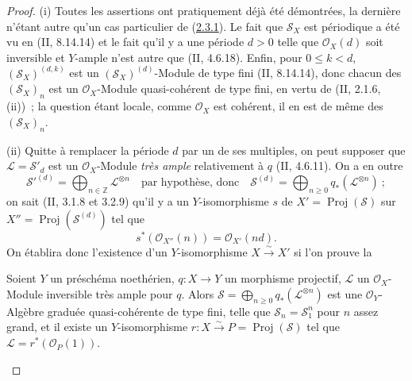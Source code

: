 \begin{proof}
(i) Toutes les assertions ont pratiquement déjà été démontrées, la
dernière n'étant autre qu'un cas particulier de
(\hyperref[III.2.3.1-fr]{2.3.1}). Le fait que $\mathcal S_X$ est
périodique a été vu en (II, 8.14.14) et le fait qu'il y a une période
$d>0$ telle que $\mathcal O_X(d)$ soit inversible et $Y$-ample n'est
autre que (II, 4.6.18). Enfin, pour $0\leq k<d$,
$(\mathcal S_X)^{(d,k)}$ est un $(\mathcal S_X)^{(d)}$-Module de type fini
(II, 8.14.14), donc chacun des $(\mathcal S_X)_n$ est un
$\mathcal O_X$-Module quasi-cohérent de type fini, en vertu de
(II, 2.1.6, (ii))~; la question étant locale, comme $\mathcal O_X$ est
cohérent, il en est de même des $(\mathcal S_X)_n$.

(ii) Quitte à remplacer la période $d$ par un de ses multiples, on peut
supposer que $\mathcal L=\mathcal S'_d$ est un $\mathcal O_X$-Module
\emph{très ample} relativement à $q$ (II, 4.6.11). On a en outre
\[
\mathcal S'^{(d)}=\bigoplus_{n\in\mathbb Z}\mathcal L^{\otimes n}
\quad\text{par hypothèse, donc}\quad
\mathcal S^{(d)}=\bigoplus_{n\geq0}q_*(\mathcal L^{\otimes n})~;
\]
on sait (II, 3.1.8 et 3.2.9) qu'il y a un $Y$-isomorphisme $s$ de
$X'=\operatorname{Proj}(\mathcal S)$ sur
$X''=\operatorname{Proj}(\mathcal S^{(d)})$ tel que
\[
s^*(\mathcal O_{X''}(n))=\mathcal O_{X'}(nd).
\]
On établira donc l'existence d'un $Y$-isomorphisme $X\xrightarrow{\sim}X'$
si l'on prouve la

\begin{env}[2.3.4.1]
\label{III.2.3.4.1-fr}
Soient $Y$ un préschéma noethérien, $q:X\to Y$ un morphisme projectif,
$\mathcal L$ un $\mathcal O_X$-Module inversible très ample pour $q$.
Alors $\mathcal S=\bigoplus_{n\geq0}q_*(\mathcal L^{\otimes n})$ est une
$\mathcal O_Y$-Algèbre graduée quasi-cohérente de type fini, telle que
$\mathcal S_n=\mathcal S_1^n$ pour $n$ assez grand, et il existe un
$Y$-isomorphisme $r:X\xrightarrow{\sim}P=\operatorname{Proj}(\mathcal S)$
tel que $\mathcal L=r^*(\mathcal O_P(1))$.
\end{env}


\end{proof}
